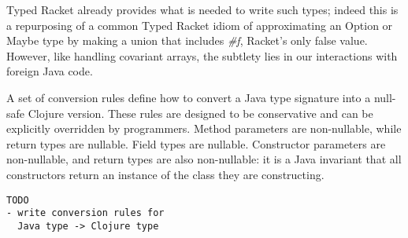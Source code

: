 Typed Racket already provides what is needed to write such types; indeed this is a repurposing
of a common Typed Racket idiom of approximating an Option or Maybe type by
making a union that includes \emph{\#f}, Racket's only false value.
However, like handling covariant arrays, the subtlety lies in our interactions with foreign
Java code.

A set of conversion rules define how to convert a Java type signature into a null-safe
Clojure version. These rules are designed to be conservative and can be explicitly overridden
by programmers. Method parameters are non-nullable, while return types are nullable.
Field types are nullable. Constructor parameters are non-nullable, and return types
are also non-nullable: it is a Java invariant that all constructors return an instance
of the class they are constructing.

\begin{verbatim}
TODO 
- write conversion rules for 
  Java type -> Clojure type
\end{verbatim}


